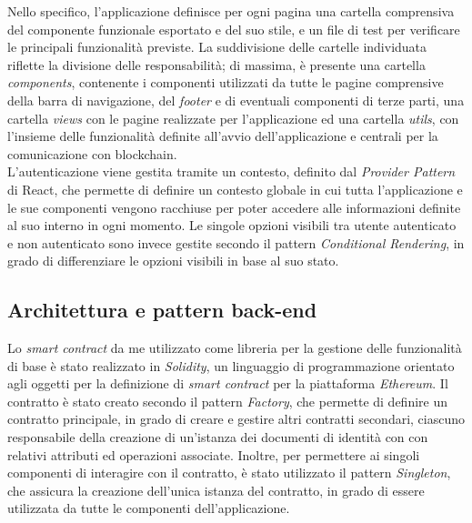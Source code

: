 \newpage
Nello specifico, l'applicazione definisce per ogni pagina una cartella comprensiva del componente funzionale
esportato e del suo stile, e un file di test per verificare le principali funzionalità previste.
La suddivisione delle cartelle individuata riflette la divisione delle responsabilità; di massima, è presente una cartella \textit{components}, contenente i componenti utilizzati da tutte le pagine 
comprensive della barra di navigazione, del \textit{footer} e di eventuali componenti di terze parti, una cartella \textit{views} con le pagine realizzate per l'applicazione ed
una cartella \textit{utils}, con l'insieme delle funzionalità definite all'avvio dell'applicazione e centrali per la comunicazione con blockchain. \\
L'autenticazione viene gestita tramite un contesto, definito dal \textit{Provider Pattern} di React, che permette di definire un contesto globale
in cui tutta l'applicazione e le sue componenti vengono racchiuse per poter accedere alle informazioni definite al suo interno in ogni momento.
Le singole opzioni visibili tra utente autenticato e non autenticato sono invece gestite secondo il pattern \textit{Conditional Rendering}, in grado di differenziare le opzioni
visibili in base al suo stato.

\subsection{Architettura e pattern back-end}
Lo \textit{smart contract} da me utilizzato come libreria per la gestione delle funzionalità di base è stato realizzato in \textit{Solidity}, un linguaggio di programmazione
orientato agli oggetti per la definizione di \textit{smart contract} per la piattaforma \textit{Ethereum}. 
Il contratto è stato creato secondo il pattern \textit{Factory}, che permette di definire un contratto principale, in grado di creare e gestire altri contratti secondari,
ciascuno responsabile della creazione di un'istanza dei documenti di identità con  con relativi attributi ed operazioni associate.
Inoltre, per permettere ai singoli componenti di interagire con il contratto, è stato utilizzato il pattern \textit{Singleton}, che assicura la creazione dell'unica istanza
del contratto, in grado di essere utilizzata da tutte le componenti dell'applicazione. \\

